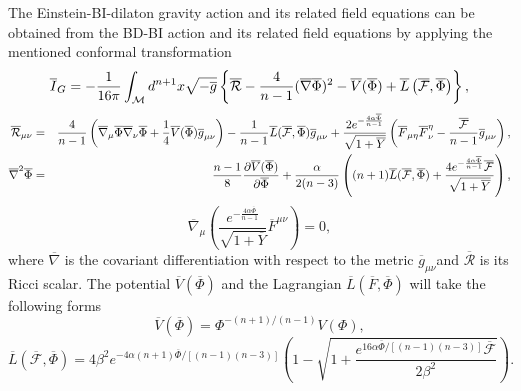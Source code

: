 \documentclass[aps,onecolumn ]{revtex4}
\begin{document}
The Einstein-BI-dilaton gravity action and its related field equations can
be obtained from the BD-BI action and its related field equations by
applying the mentioned conformal transformation \cite{BDvsDilaton}
\begin{equation}
\overline{I}_{G}=-\frac{1}{16\pi }\int_{\mathcal{M}}d^{n+1}x\sqrt{-\overline{%
g}}\left\{ \overline{\mathcal{R}}-\frac{4}{n-1}(\overline{\nabla }\overline{%
\Phi })^{2}-\overline{V}(\overline{\Phi })+\overline{L}\left( \overline{%
\mathcal{F}},\overline{\Phi }\right) \right\} ,  \label{con-ac}
\end{equation}%
\begin{eqnarray}
\overline{\mathcal{R}}_{\mu \nu } &=&\frac{4}{n-1}\left( \overline{\nabla }%
_{\mu }\overline{\Phi }\overline{\nabla }_{\nu }\overline{\Phi }+\frac{1}{4}%
\overline{V}(\overline{\Phi })\overline{g}_{\mu \nu }\right) -\frac{1}{n-1}%
\overline{L}(\overline{\mathcal{F}},\overline{\Phi })\overline{g}_{\mu \nu }+%
\frac{2e^{-\frac{4\alpha \overline{\Phi }}{n-1}}}{\sqrt{1+\overline{Y}}}%
\left( \overline{F}_{\mu \eta }\overline{F}_{\nu }^{\eta }-\frac{\overline{%
\mathcal{F}}}{n-1}\overline{g}_{\mu \nu }\right) ,  \label{FE1} \\
\overline{\nabla }^{2}\overline{\Phi } &=&\frac{n-1}{8}\frac{\partial
\overline{V}(\overline{\Phi })}{\partial \overline{\Phi }}+\frac{\alpha }{%
2(n-3)}\left( (n+1)\overline{L}(\overline{\mathcal{F}},\overline{\Phi })+%
\frac{4e^{-\frac{4\alpha \overline{\Phi }}{n-1}}\overline{\mathcal{F}}}{%
\sqrt{1+\overline{Y}}}\right) ,  \label{FE2}
\end{eqnarray}%
\begin{equation}
\overline{\nabla }_{\mu }\left( \frac{e^{-\frac{4\alpha \overline{\Phi }}{n-1%
}}}{\sqrt{1+\overline{Y}}}\overline{F}^{\mu \nu }\right) =0,  \label{FE3}
\end{equation}%
where $\overline{\nabla }$ is the covariant differentiation with respect to
the metric $\overline{g}_{\mu \nu }$and $\overline{\mathcal{R}}$ is its
Ricci scalar. The potential $\overline{V}\left( \overline{\Phi }\right) $
and the Lagrangian $\overline{L}\left( \overline{F},\overline{\Phi }\right) $
will take the following forms \cite{BDvsDilaton}
\begin{equation}
\overline{V}(\overline{\Phi })=\Phi ^{-(n+1)/(n-1)}V(\Phi ),  \label{poten}
\end{equation}%
\begin{equation}
\overline{L}\left( \overline{\mathcal{F}},\overline{\Phi }\right) =4\beta
^{2}e^{-4\alpha \left( n+1\right) \overline{\Phi }/\left[ \left( n-1\right)
\left( n-3\right) \right] }\left( 1-\sqrt{1+\frac{e^{16\alpha \overline{\Phi
}/\left[ \left( n-1\right) \left( n-3\right) \right] }\overline{\mathcal{F}}%
}{2\beta ^{2}}}\right) .  \label{LFP}
\end{equation}
\end{document}
